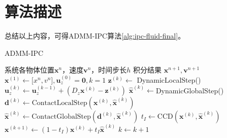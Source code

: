 \section{算法描述}

总结以上内容，可得ADMM-IPC算法\ref{alg:ipc-fluid-final}。
\begin{algorithm}[H]
  \caption{ADMM-IPC}\label{alg:ipc-fluid-final}
  \begin{algorithmic}[1]
    \Require 系统各物体位置$\mathbf x^n$，速度$\mathbf v^n$，时间步长$h$
    \Ensure 积分结果 $\mathbf x^{n+1}, \mathbf v^{n+1}$
    \State $\mathbf x^{(1)} \leftarrow \mathbf [x^{n}, v^{n}], \mathbf u_z^{(0)} = \mathbf 0, k = 1$
      \State $\mathbf z^{(k)} \leftarrow$ DynamicLocalStep()
      \State $\mathbf{u}_{z} ^{(k)} \leftarrow \mathbf{u}_{z}^{(k-1)} + (D_{z} \mathbf{x} ^{(k)}- \mathbf{z}^{(k)})$
      \State $\hat{\mathbf x}^{(k)} \leftarrow $DynamicGlobalStep()
      \State $\mathbf{d}^{(k)} \leftarrow \text{ContactLocalStep}(\mathbf{x}^{(k)}, \hat{\mathbf{x}}^{(k)})$
      \State $\hat{\mathbf{x}}^{(k)}\leftarrow \text{ContactGlobalStep}(\mathbf{d}^{(k)}, \hat{\mathbf{x}}^{(k)})$
      \State $t_I \leftarrow \text{CCD}(\mathbf x^{(k)}, \hat{\mathbf x}^{(k)})$
      \State $\mathbf{x}^{(k+1)} \leftarrow (1-t_{I}) \mathbf{x}^{(k)} +t_{I} \hat{\mathbf{x}}^{(k)}$
      \State $k \leftarrow k + 1$
    \EndWhile
  \end{algorithmic}
\end{algorithm}







